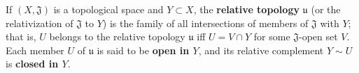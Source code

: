 If $(X, \mathfrak{J})$ is a topological space and $Y \subset X$, the \textbf{relative topology} $\mathfrak{u}$ (or the relativization of $\mathfrak{J}$ to $Y$) is the family of all intersections of members of $\mathfrak{J}$ with $Y$; that is, $U$ belongs to the relative topology $\mathfrak{u}$ iff $U = V \cap Y$ for some $\mathfrak{J}$-open set $V$. Each member $U$ of $\mathfrak{u}$ is said to be \textbf{open in $Y$}, and its relative complement $Y \sim U$ is \textbf{closed in $Y$}.
